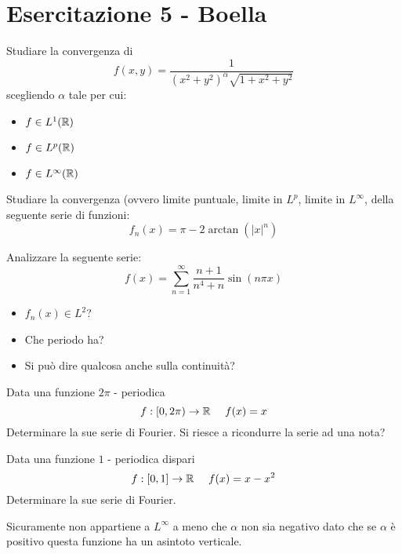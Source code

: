 \chapter{Esercitazione 5 - Boella}
\ParteEsercizi
\Esercizio{}

Studiare la convergenza di
\begin{equation*}
f(x,y) = \frac{1}{(x^{2} + y^{2})^{\alpha }\sqrt{1 + x^{2} + y^{2}}}
\end{equation*}
scegliendo $\alpha $ tale per cui:
\begin{itemize}
\item $f\in L^{1} (\mathbb{R})$
\item $f\in L^{p} (\mathbb{R})$
\item $f\in L^{\infty } (\mathbb{R})$
\end{itemize}
\Esercizio{}

Studiare la convergenza (ovvero limite puntuale, limite in $L^{p}$, limite in $L^{\infty }$, della seguente serie di funzioni:
\begin{equation*}
f_{n} (x) = \pi - 2\arctan (|x|^{n})
\end{equation*}
\Esercizio{}

Analizzare la seguente serie:
\begin{equation*}
f(x) = \sum ^{\infty }_{n = 1}\frac{n + 1}{n^{4} + n}\sin (n\pi x)
\end{equation*}
\begin{itemize}
\item $f_{n} (x)\in L^{2}$?
\item Che periodo ha?
\item Si può dire qualcosa anche sulla continuità?
\end{itemize}
\Esercizio{}

Data una funzione $2\pi $ - periodica
\begin{equation*}
f:[ 0,2\pi)\rightarrow \RR  \ \ \ \ f(x) = x
\end{equation*}
Determinare la sue serie di Fourier. Si riesce a ricondurre la serie ad una nota?
\Esercizio{}

Data una funzione $1$ - periodica dispari
\begin{equation*}
f:[ 0,1]\rightarrow \mathbb{R}  \ \ \ \ f(x) = x - x^{2}
\end{equation*}
Determinare la sue serie di Fourier.
\ParteSoluzioni
\Soluzione

Sicuramente non appartiene a $L^{\infty }$ a meno che $\alpha $ non sia negativo dato che se $\alpha $ è positivo questa funzione ha un asintoto verticale.

